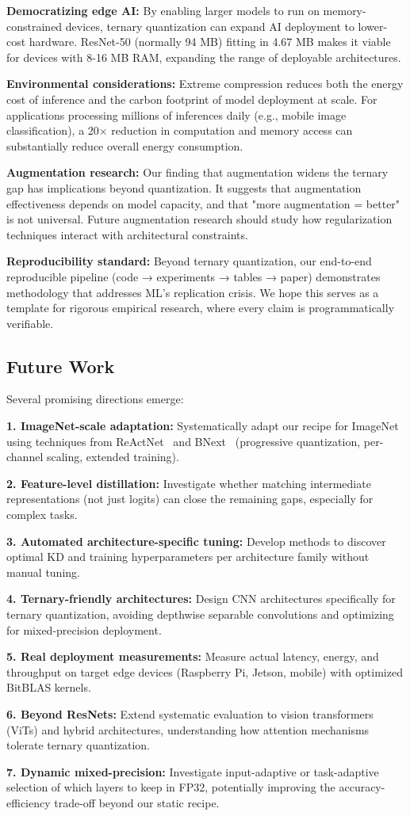 \textbf{Democratizing edge AI:} By enabling larger models to run on memory-constrained devices, ternary quantization can expand AI deployment to lower-cost hardware. ResNet-50 (normally 94 MB) fitting in 4.67 MB makes it viable for devices with 8-16 MB RAM, expanding the range of deployable architectures.

\textbf{Environmental considerations:} Extreme compression reduces both the energy cost of inference and the carbon footprint of model deployment at scale. For applications processing millions of inferences daily (e.g., mobile image classification), a 20× reduction in computation and memory access can substantially reduce overall energy consumption.

\textbf{Augmentation research:} Our finding that augmentation widens the ternary gap has implications beyond quantization. It suggests that augmentation effectiveness depends on model capacity, and that "more augmentation = better" is not universal. Future augmentation research should study how regularization techniques interact with architectural constraints.

\textbf{Reproducibility standard:} Beyond ternary quantization, our end-to-end reproducible pipeline (code → experiments → tables → paper) demonstrates methodology that addresses ML's replication crisis. We hope this serves as a template for rigorous empirical research, where every claim is programmatically verifiable.

\subsection{Future Work}

Several promising directions emerge:

\textbf{1. ImageNet-scale adaptation:} Systematically adapt our recipe for ImageNet using techniques from ReActNet~\cite{liu2020reactnet} and BNext~\cite{guo2022bnext} (progressive quantization, per-channel scaling, extended training).

\textbf{2. Feature-level distillation:} Investigate whether matching intermediate representations (not just logits) can close the remaining gaps, especially for complex tasks.

\textbf{3. Automated architecture-specific tuning:} Develop methods to discover optimal KD and training hyperparameters per architecture family without manual tuning.

\textbf{4. Ternary-friendly architectures:} Design CNN architectures specifically for ternary quantization, avoiding depthwise separable convolutions and optimizing for mixed-precision deployment.

\textbf{5. Real deployment measurements:} Measure actual latency, energy, and throughput on target edge devices (Raspberry Pi, Jetson, mobile) with optimized BitBLAS kernels.

\textbf{6. Beyond ResNets:} Extend systematic evaluation to vision transformers (ViTs) and hybrid architectures, understanding how attention mechanisms tolerate ternary quantization.

\textbf{7. Dynamic mixed-precision:} Investigate input-adaptive or task-adaptive selection of which layers to keep in FP32, potentially improving the accuracy-efficiency trade-off beyond our static recipe.
